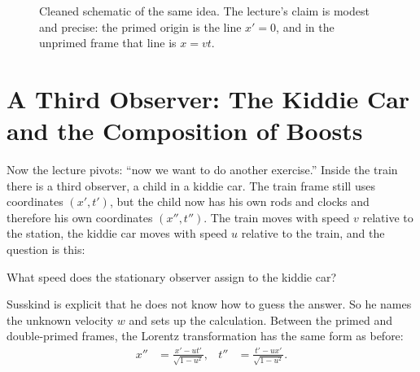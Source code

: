 \begin{figure}[t]
\centering
{}
\caption{Cleaned schematic of the same idea. The lecture's claim is modest and precise: the primed origin is the line \(x'=0\), and in the unprimed frame that line is \(x=vt\).}
\end{figure}

\section{A Third Observer: The Kiddie Car and the Composition of Boosts}

Now the lecture pivots: ``now we want to do another exercise.'' Inside the train there is a third observer, a child in a kiddie car. The train frame still uses coordinates \((x',t')\), but the child now has his own rods and clocks and therefore his own coordinates \((x'',t'')\). The train moves with speed \(v\) relative to the station, the kiddie car moves with speed \(u\) relative to the train, and the question is this:

What speed does the stationary observer assign to the kiddie car?

Susskind is explicit that he does not know how to guess the answer. So he names the unknown velocity \(w\) and sets up the calculation. Between the primed and double-primed frames, the Lorentz transformation has the same form as before:
\begin{align}
x'' &= \frac{x'-ut'}{\sqrt{1-u^2}},
&
t'' &= \frac{t'-ux'}{\sqrt{1-u^2}}.
\end{align}

